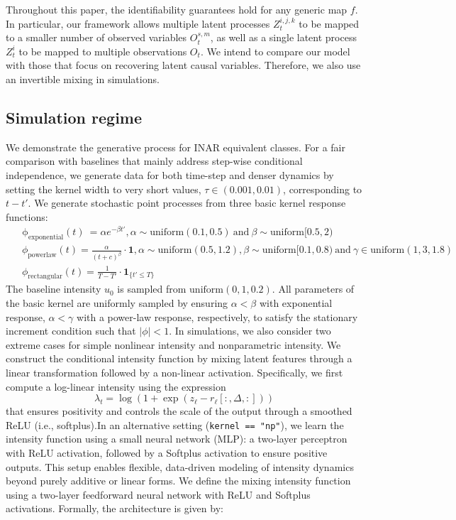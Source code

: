 \documentclass[10pt]{article}
\numberwithin{figure}{section}
\begin{document}
Throughout this paper, the identifiability guarantees hold for any generic map $f$. In particular, our framework allows multiple latent processes $Z_t^{i,j,k}$ to be mapped to a smaller number of observed variables $O_t^{s,m}$, as well as a single latent process $Z_t^i$ to be mapped to multiple observations $O_t$. We intend to compare our model with those that focus on recovering latent causal variables. Therefore, we also use an invertible mixing in simulations.

\subsection{Simulation regime}\label{detail_simulation}

We demonstrate the generative process for INAR equivalent classes.  For a fair comparison with baselines that mainly address step-wise conditional independence, we generate data for both time-step and denser dynamics by setting the kernel width to very short values, $\tau\in (0.001,0.01) $, corresponding to $ t-t'$. We generate stochastic point processes from three basic kernel response functions:
\begin{align*}
&\mathrm{\phi_{exponential}}(t)\ = \alpha e^{-\beta t'}, \alpha\sim \mathrm{uniform}(0.1,0.5) ~\mathrm{and}~ \beta\sim \mathrm{uniform}[0.5,2) \\~~
&\phi_{\mathrm{powerlaw}}(t) = \frac{\alpha}{(t + c)^{\beta}} \cdot \mathbf{1},\alpha\sim \mathrm{uniform}(0.5,1.2) , \beta\sim \mathrm{uniform}[0.1,0.8)~\mathrm{and}~ \gamma \in \mathrm{uniform}(1,3,1.8)\\
&\phi_{\mathrm{rectangular}}(t) = \frac{1}{T-T'} \cdot \mathbf{1}_{\{t' \leq T\}}
\end{align*}
The baseline intensity $u_0$ is sampled from $\mathrm{uniform}(0,1,0.2)$. All parameters of the basic kernel are uniformly sampled by ensuring $\alpha < \beta$  with exponential response, $\alpha < \gamma$ with a power-law response, respectively, to satisfy the stationary increment condition such that $|\phi|<1$. In simulations, we also consider two extreme cases for simple nonlinear intensity and nonparametric intensity. We construct the conditional intensity function by mixing latent features through a linear transformation followed by a non-linear activation. Specifically, we first compute a log-linear intensity using the expression
\[
\lambda_t = \log(1 + \exp(z_\ell - r_\ell[:, \Delta, :]))
\]
that ensures positivity and controls the scale of the output through a smoothed ReLU (i.e., softplus).In an alternative setting (\texttt{kernel == "np"}), we learn the intensity function using a small neural network (MLP): a two-layer perceptron with ReLU activation, followed by a Softplus activation to ensure positive outputs. This setup enables flexible, data-driven modeling of intensity dynamics beyond purely additive or linear forms. We define the mixing intensity function using a two-layer feedforward neural network with ReLU and Softplus activations. Formally, the architecture is given by:
\end{document}
